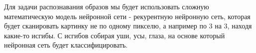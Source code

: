 Для задачи распознавания образов мы будет использовать сложную математическую модель нейронной сети - рекурентную нейронную сеть, которая будет сканировать картинку не по одному пикселю, а например по 3 на 3, находя какие-то исгибы. С исгибов собирая уши, усы, глаза, на основе который нейронная сеть будет классифицировать.